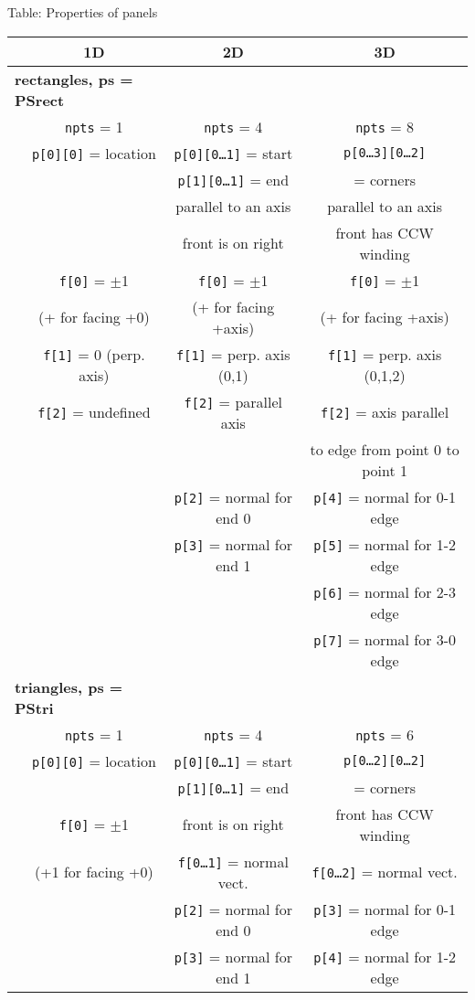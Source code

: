 \documentclass {book}
\begin{document}
Table: Properties of panels

\begin{longtable}[c]{lccc}
&1D&2D&3D\\
\hline
\multicolumn{2}{l}{\textbf{rectangles, ps = PSrect}}\\
&\texttt{npts} = 1&\texttt{npts} = 4&\texttt{npts} = 8\\ 
&\texttt{p[0][0]} = location&\texttt{p[0][0\ldots1]} = start&\texttt{p[0\ldots3][0\ldots2]}\\ 
&&\texttt{p[1][0\ldots1]} = end&= corners\\ 
&&parallel to an axis&parallel to an axis\\ 
&&front is on right&front has CCW winding\\ 
&\texttt{f[0]} = $\pm$1&\texttt{f[0]} = $\pm$1&\texttt{f[0]} = $\pm$1\\ 
&(+ for facing +0)&(+ for facing +axis)&(+ for facing +axis)\\ 
&\texttt{f[1]} = 0 (perp. axis)&\texttt{f[1]} = perp. axis (0,1)&\texttt{f[1]} = perp. axis (0,1,2)\\ 
&\texttt{f[2]} = undefined&\texttt{f[2]} = parallel axis&\texttt{f[2]} = axis parallel\\ 
&&&to edge from point 0 to point 1\\
&&\texttt{p[2]} = normal for end 0&\texttt{p[4]} = normal for 0-1 edge\\
&&\texttt{p[3]} = normal for end 1&\texttt{p[5]} = normal for 1-2 edge\\
&&&\texttt{p[6]} = normal for 2-3 edge\\
&&&\texttt{p[7]} = normal for 3-0 edge\\
\hline
\multicolumn{2}{l}{\textbf{triangles, ps = PStri}}\\
&\texttt{npts} = 1&\texttt{npts} = 4&\texttt{npts} = 6\\ 
&\texttt{p[0][0]} = location&\texttt{p[0][0\ldots1]} = start&\texttt{p[0\ldots2][0\ldots2]}\\ 
&&\texttt{p[1][0\ldots1]} = end&= corners\\ 
&\texttt{f[0]} = $\pm$1&front is on right&front has CCW winding\\ 
&(+1 for facing +0)&\texttt{f[0\ldots1]} = normal vect.&\texttt{f[0\ldots2]} = normal vect.\\
&&\texttt{p[2]} = normal for end 0&\texttt{p[3]} = normal for 0-1 edge\\
&&\texttt{p[3]} = normal for end 1&\texttt{p[4]} = normal for 1-2 edge\\

\end{longtable}
\end{document}
